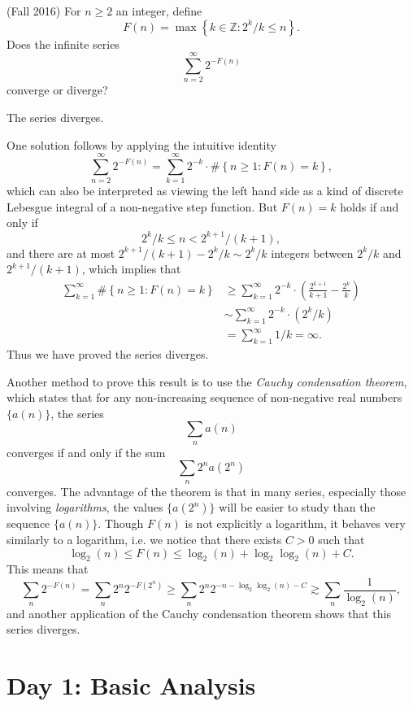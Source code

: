 \documentclass{exam}
\theoremstyle{problemstyle}
\newcommand{\1}[1]{\textbf{1}_{\left[#1\right]}} %
\def\Z{\mathbb{Z}} %
\begin{document}
\begin{questions}

\question (Fall 2016)
  For $n \geq 2$ an integer, define
  \[ F(n)= \max \left\{ k\in \Z: 2^{k}/k\leq n \right\}. \]
  Does the infinite series
  \[ \sum_{n=2}^{\infty}2^{-F(n)} \]
  converge or diverge?
\begin{solution}
	The series diverges.

	One solution follows by applying the intuitive identity
	\[ \sum_{n = 2}^\infty 2^{-F(n)} = \sum_{k = 1}^\infty 2^{-k} \cdot \# \left\{ n \geq 1 : F(n) = k \right\}, \]
	which can also be interpreted as viewing the left hand side as a kind of discrete Lebesgue integral of a non-negative step function. But $F(n) = k$ holds if and only if
	\[ 2^k/k \leq n < 2^{k+1} / (k+1), \]
	and there are at most $2^{k+1} / (k+1) - 2^k / k \sim 2^k / k$ integers between $2^k / k$ and $2^{k+1} / (k+1)$, which implies that
	\begin{align*}
		\sum_{k = 1}^\infty \# \left\{ n \geq 1: F(n) = k \right\} &\geq \sum_{k=1}^{\infty} 2^{-k} \cdot \left( \frac{2^{k+1}}{k+1}-\frac{2^{k}}{k} \right)\\
    &\sim \sum_{k=1}^{\infty} 2^{-k} \cdot (2^k / k)\\
    &=\sum_{k=1}^{\infty} 1/k = \infty.
  \end{align*}
  Thus we have proved the series diverges.

  Another method to prove this result is to use the \emph{Cauchy condensation theorem}, which states that for any non-increasing sequence of non-negative real numbers $\{ a(n) \}$, the series
	\[ \sum_n a(n) \]
	converges if and only if the sum
	\[ \sum_n 2^n a(2^n) \]
	converges. The advantage of the theorem is that in many series, especially those involving \emph{logarithms}, the values $\{ a(2^n) \}$ will be easier to study than the sequence $\{ a(n) \}$. Though $F(n)$ is not explicitly a logarithm, it behaves very similarly to a logarithm, i.e. we notice that there exists $C > 0$ such that
	\[ \log_2(n) \leq F(n) \leq \log_2(n) + \log_2 \log_2(n) + C. \]
	This means that
	\[ \sum_n 2^{-F(n)} = \sum_n 2^n 2^{-F(2^n)} \geq \sum_n 2^n 2^{- n - \log_2 \log_2(n) - C } \gtrsim \sum_n \frac{1}{\log_2(n)}, \]
	and another application of the Cauchy condensation theorem shows that this series diverges.
\end{solution}

\newpage

\section{Day 1: Basic Analysis}


\end{questions}
\end{document}

